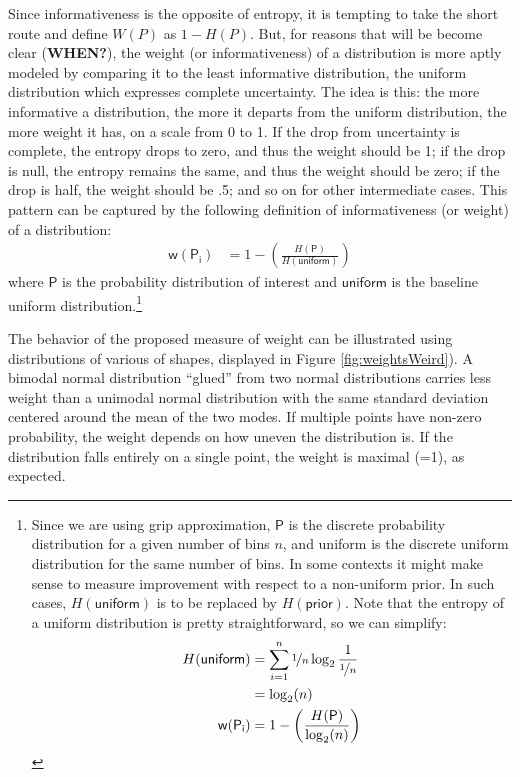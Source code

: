 \documentclass[
  10pt,
  dvipsnames,enabledeprecatedfontcommands]{scrartcl}
\begin{document}
Since informativeness is the opposite of entropy, it is tempting to take
the short route and define \(W(P)\) as \(1-H(P)\). But, for reasons that
will be become clear (\textbf{WHEN?}), the weight (or informativeness)
of a distribution is more aptly modeled by comparing it to the least
informative distribution, the uniform distribution which expresses
complete uncertainty. The idea is this: the more informative a
distribution, the more it departs from the uniform distribution, the
more weight it has, on a scale from 0 to 1. If the drop from uncertainty
is complete, the entropy drops to zero, and thus the weight should be 1;
if the drop is null, the entropy remains the same, and thus the weight
should be zero; if the drop is half, the weight should be .5; and so on
for other intermediate cases. This pattern can be captured by the
following definition of informativeness (or weight) of a distribution:
\begin{align*}
\mathsf{w(P_i)} & = 1 - \left( \frac{H(\mathsf{P})}{H(\mathsf{uniform})}\right)
\end{align*} \noindent where \(\mathsf{P}\) is the probability
distribution of interest and \(\mathsf{uniform}\) is the baseline
uniform distribution.\footnote{Since we are using grip approximation,
  \(\mathsf{P}\) is the discrete probability distribution for a given
  number of bins \(n\), and uniform is the discrete uniform distribution
  for the same number of bins. In some contexts it might make sense to
  measure improvement with respect to a non-uniform prior. In such
  cases, \(H(\mathsf{uniform})\) is to be replaced by
  \(H(\mathsf{prior})\). Note that the entropy of a uniform distribution
  is pretty straightforward, so we can simplify: \begin{align*}
  H(\mathsf{uniform}) & = \sum_{i=1}^n \nicefrac{1}{n} \log_2 \frac{1}{\nicefrac{1}{n}} \\
  & = \log_2(n) \\
  \mathsf{w(P_i)} & = 1 - \left( \frac{H(\mathsf{P})}{\log_2(n)}\right)
  \end{align*}}

The behavior of the proposed measure of weight can be illustrated using
distributions of various of shapes, displayed in Figure
\ref{fig:weightsWeird}). A bimodal normal distribution ``glued'' from
two normal distributions carries less weight than a unimodal normal
distribution with the same standard deviation centered around the mean
of the two modes. If multiple points have non-zero probability, the
weight depends on how uneven the distribution is. If the distribution
falls entirely on a single point, the weight is maximal (=1), as
expected.
\end{document}
